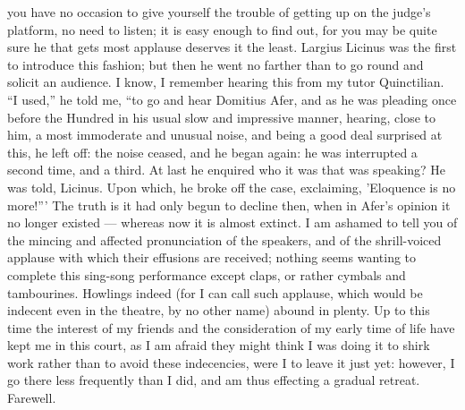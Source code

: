 you have no occasion to give yourself the trouble of getting up on the
judge's platform, no need to listen; it is easy enough to find out, for
you may be quite sure he that gets most applause deserves it the least.
Largius Licinus was the first to introduce this fashion; but then he went
no farther than to go round and solicit an audience. I know, I remember
hearing this from my tutor Quinctilian. ``I used,'' he told me, ``to go and
hear Domitius Afer, and as he was pleading once before the Hundred in his
usual slow and impressive manner, hearing, close to him, a most immoderate
and unusual noise, and being a good deal surprised at this, he left off:
the noise ceased, and he began again: he was interrupted a second time,
and a third. At last he enquired who it was that was speaking? He was
told, Licinus. Upon which, he broke off the case, exclaiming, 'Eloquence
is no more!''' The truth is it had only begun to decline then, when in
Afer's opinion it no longer existed — whereas now it is almost
extinct. I am ashamed to tell you of the mincing and affected
pronunciation of the speakers, and of the shrill-voiced applause with
which their effusions are received; nothing seems wanting to complete this
sing-song performance except claps, or rather cymbals and tambourines.
Howlings indeed (for I can call such applause, which would be indecent
even in the theatre, by no other name) abound in plenty. Up to this time
the interest of my friends and the consideration of my early time of life
have kept me in this court, as I am afraid they might think I was doing it
to shirk work rather than to avoid these indecencies, were I to leave it
just yet: however, I go there less frequently than I did, and am thus
effecting a gradual retreat. Farewell.


